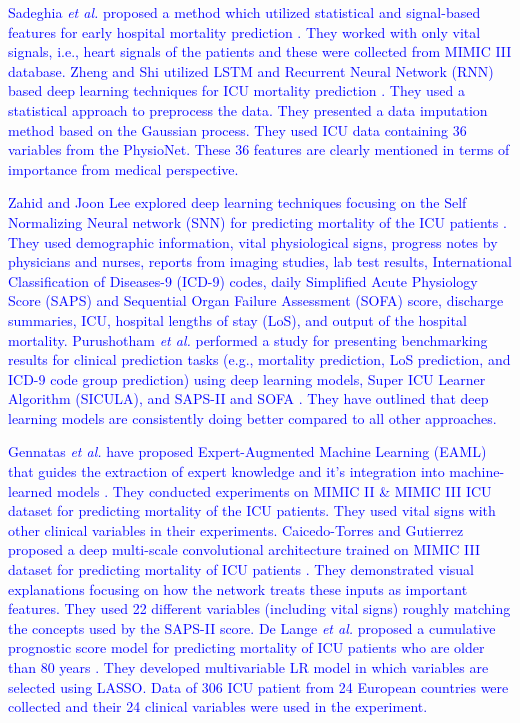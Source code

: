 \textcolor{blue}{Sadeghia \textit{et al.} proposed a method which utilized statistical and signal-based features for early hospital mortality prediction \cite{Sadeghi2018}. They worked with only vital signals, i.e., heart signals of the patients and these were collected from MIMIC III database. Zheng and Shi utilized LSTM and Recurrent Neural Network (RNN) based deep learning techniques for ICU mortality prediction \cite{Zheng2018}. They used a statistical approach to preprocess the data. They presented a data imputation method based on the Gaussian process. They used ICU data containing 36 variables from the PhysioNet. These 36 features are clearly mentioned in terms of importance from medical perspective.} 

\textcolor{blue}{Zahid and Joon Lee explored deep learning techniques focusing on the Self Normalizing Neural network (SNN) for predicting mortality of the ICU patients \cite{Zahid2018}. They used demographic information, vital physiological signs, progress notes by physicians and nurses, reports from imaging studies, lab test results, International Classification of Diseases-9 (ICD-9) codes, daily Simplified Acute Physiology Score (SAPS) and Sequential Organ Failure Assessment (SOFA) score, discharge summaries, ICU, hospital lengths of stay (LoS), and output of the hospital mortality. Purushotham \textit{et al.} performed a study for presenting benchmarking results for clinical prediction tasks (e.g., mortality prediction, LoS prediction, and ICD-9 code group prediction) using deep learning models, Super ICU Learner Algorithm (SICULA), and SAPS-II and SOFA \cite{Purushotham2018}. They have outlined that deep learning models are consistently doing better compared to all other approaches.} 

\textcolor{blue}{Gennatas \textit{et al.} have proposed Expert-Augmented Machine Learning (EAML) that guides the extraction of expert knowledge and it's integration into machine-learned models \cite{Gennatas2019}. They conducted experiments on MIMIC II \& MIMIC III ICU dataset for predicting mortality of the ICU patients. They used vital signs with other clinical variables in their experiments. Caicedo-Torres and Gutierrez proposed a deep multi-scale convolutional architecture trained on MIMIC III dataset for predicting mortality of ICU patients \cite{Torres2019}. They demonstrated visual explanations focusing on how the network treats these inputs as important features. They used 22 different variables (including vital signs) roughly matching the concepts used by the SAPS-II score. De Lange \textit{et al.} proposed a cumulative prognostic score model for predicting mortality of ICU patients who are older than 80 years \cite{Lange2019}. They developed multivariable LR model in which variables are selected using LASSO. Data of 306 ICU patient from 24 European countries were collected and their 24 clinical variables were used in the experiment.}

